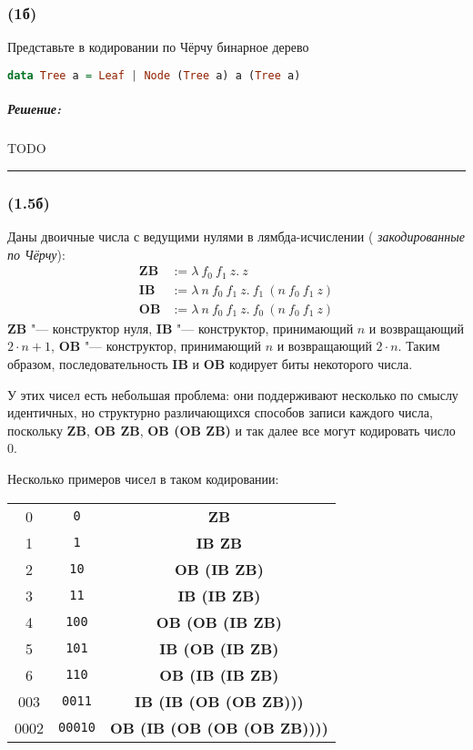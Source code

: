 \documentclass{article}
\newenvironment{proof}{\subparagraph{\hspace{-1em}Решение:\newline}}{\par\noindent\rule{\textwidth}{0.4pt}}
\renewcommand{\emph}[1]{{\color{blue} \textit{#1}}}
\begin{document}
    \subsubsection{(1б)}

    Представьте в кодировании по Чёрчу бинарное дерево
    \begin{lstlisting}[language=Haskell]
    data Tree a = Leaf | Node (Tree a) a (Tree a)
    \end{lstlisting}

    \begin{proof}
        TODO %
    \end{proof}

    \subsubsection{(1.5б)}

    Даны двоичные числа с ведущими нулями в лямбда-исчислении
    (\emph{закодированные по Чёрчу}):
    $$\begin{array}{ll}
        \mathbf{ZB}&:= \lambda~f_0~f_1~z.~z \\
        \mathbf{IB}&:= \lambda~n~f_0~f_1~z.~f_1~(n~f_0~f_1~z) \\
        \mathbf{OB}&:= \lambda~n~f_0~f_1~z.~f_0~(n~f_0~f_1~z)
    \end{array}$$
    \textbf{ZB} "--- конструктор нуля, \textbf{IB} "--- конструктор,
    принимающий $n$ и возвращающий $2 \cdot n + 1$, \textbf{OB} "---
    конструктор, принимающий $n$ и возвращающий $2 \cdot n$. Таким
    образом, последовательность \textbf{IB} и \textbf{OB} кодирует биты
    некоторого числа.

    У этих чисел есть небольшая проблема: они поддерживают несколько по смыслу
    идентичных, но структурно различающихся способов записи каждого числа,
    поскольку \textbf{ZB}, \textbf{OB ZB}, \textbf{OB (OB ZB)} и так далее все
    могут кодировать число 0.

    Несколько примеров чисел в таком кодировании:
    \begin{center}
        \begin{tabular}{|c|c|c|}
            \hline
            0 & \texttt{0} & \textbf{ZB} \\
            1 & \texttt{1} & \textbf{IB ZB} \\
            2 & \texttt{10} & \textbf{OB (IB ZB)} \\
            3 & \texttt{11} & \textbf{IB (IB ZB)} \\
            4 & \texttt{100} & \textbf{OB (OB (IB ZB)} \\
            5 & \texttt{101} & \textbf{IB (OB (IB ZB)} \\
            6 & \texttt{110} & \textbf{OB (IB (IB ZB)} \\
            003 & \texttt{0011} & \textbf{IB (IB (OB (OB ZB)))} \\
            0002 & \texttt{00010} & \textbf{OB (IB (OB (OB (OB ZB))))} \\
            \hline
        \end{tabular}
    \end{center}
\end{document}
